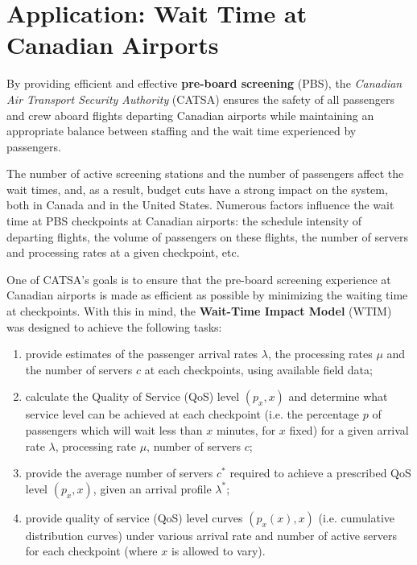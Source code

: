 \section{Application: Wait Time at Canadian Airports}
By providing efficient and effective \textbf{pre-board screening} (PBS), the \textit{Canadian Air Transport Security Authority} (CATSA) ensures the safety of all passengers and crew aboard flights departing Canadian airports while maintaining an appropriate balance between staffing and the wait time experienced by passengers. \par The number of active screening stations and the number of passengers affect the wait times, and, as a result, budget cuts have a strong impact on the system, both in Canada and in the United States.\newl
Numerous factors influence the wait time at PBS checkpoints at Canadian airports: the schedule intensity of departing flights, the volume of passengers on these flights, the number of servers and processing rates at a given checkpoint, etc. \par One of CATSA's goals is to ensure that the pre-board screening experience at Canadian airports is made as efficient as possible by minimizing the waiting time at checkpoints. With this in mind, the \textbf{Wait-Time Impact Model} (WTIM) was designed to achieve the following tasks: 
\begin{enumerate}[noitemsep]
\item provide estimates of the passenger arrival rates $\lambda$, the processing rates $\mu$ and the number of servers $c$ at each checkpoints, using available field data;
\item calculate the Quality of Service (QoS) level $(p_x,x)$  and determine what service level can be achieved at each checkpoint (i.e. the percentage $p$ of passengers which will wait less than $x$ minutes, for $x$ fixed) for a given arrival rate $\lambda$, processing rate $\mu$, number of servers $c$;
\item provide the average number of servers $c^*$ required to achieve a prescribed QoS level $(p_x,x)$, given an arrival profile $\lambda^*$;
\item provide quality of service (QoS) level curves $(p_x (x),x)$ (i.e. cumulative distribution curves) under various arrival rate and number of active servers for each checkpoint (where $x$ is allowed to vary).\end{enumerate}
